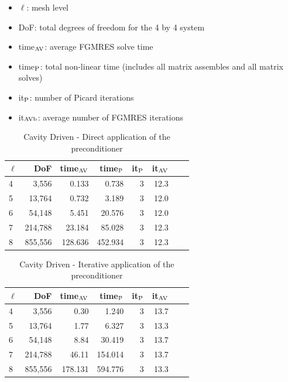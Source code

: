 \documentclass{article}
\begin{document}
\begin{itemize}
    \item $\ell$: mesh level
    \item DoF: total degrees of freedom for the 4 by 4 system
    \item time$_{\rm AV}$: average FGMRES solve time
    \item time$_{\rm P}$: total non-linear time (includes all matrix assembles and all matrix solves)
    \item it$_{\rm P}$: number of Picard iterations
    \item it$_{\rm AVb}$: average number of FGMRES iterations
\end{itemize}


\begin{table} \centering
    \begin{tabular}{lrrrrrll}
    \hline
    $\ell$ &     DoF &  time$_{\rm AV}$ &  time$_{\rm P}$ &  it$_{\rm P}$ & it$_{\rm AV}$ \\
    \hline
     4 &    3,556 &       0.133 &           0.738 & 3 & 12.3 \\
     5 &   13,764 &       0.732 &           3.189 & 3 & 12.0 \\
     6 &   54,148 &       5.451 &          20.576 & 3 & 12.0 \\
     7 &  214,788 &      23.184 &          85.028 & 3 & 12.3 \\
     8 &  855,556 &     128.636 &         452.934 & 3 & 12.3 \\
    \hline
    \end{tabular}
    \caption{Cavity Driven - Direct application of the preconditioner}
\end{table}

\begin{table} \centering
    \begin{tabular}{lrrrrrll}
    \hline
    $\ell$ &     DoF &  time$_{\rm AV}$ &  time$_{\rm P}$ &  it$_{\rm P}$ & it$_{\rm AV}$ \\
    \hline
     4 & 3,556 & 0.30 & 1.240 & 3 & 13.7 \\
     5 & 13,764 & 1.77 & 6.327 & 3 & 13.3 \\
     6 & 54,148 & 8.84 & 30.419 & 3 & 13.7 \\
     7 & 214,788 & 46.11 & 154.014 & 3 & 13.7 \\
     8 & 855,556 & 178.131 & 594.776 & 3 & 13.3\\

    \hline
    \end{tabular}
    \caption{Cavity Driven - Iterative application of the preconditioner}
\end{table}
\end{document}
